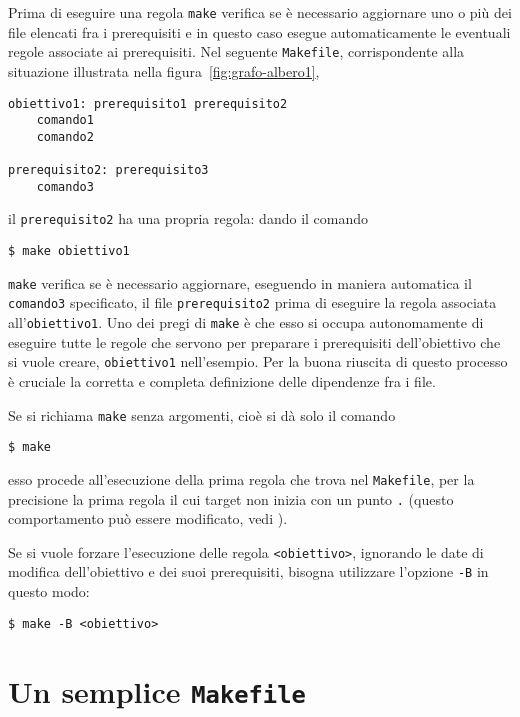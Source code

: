 Prima di eseguire una regola \texttt{make} verifica se è necessario aggiornare
uno o più dei file elencati fra i prerequisiti e in questo caso esegue
automaticamente le eventuali regole associate ai prerequisiti.  Nel seguente
\texttt{Makefile}, corrispondente alla situazione illustrata nella
figura~\ref{fig:grafo-albero1},
\begin{lstlisting}
obiettivo1: prerequisito1 prerequisito2
	comando1
	comando2

prerequisito2: prerequisito3
	comando3
\end{lstlisting}
il \texttt{prerequisito2} ha una propria regola: dando il comando
\begin{verbatim}
$ make obiettivo1
\end{verbatim} %
\texttt{make} verifica se è necessario aggiornare, eseguendo in maniera
automatica il \texttt{comando3} specificato, il file \texttt{prerequisito2}
prima di eseguire la regola associata all'\texttt{obiettivo1}.  Uno dei pregi di
\texttt{make} è che esso si occupa autonomamente di eseguire tutte le regole che
servono per preparare i prerequisiti dell'obiettivo che si vuole creare,
\texttt{obiettivo1} nell'esempio.  Per la buona riuscita di questo processo è
cruciale la corretta e completa definizione delle dipendenze fra i file.

Se si richiama \texttt{make} senza argomenti, cioè si dà solo il comando
\begin{verbatim}
$ make
\end{verbatim} %
esso procede all'esecuzione della prima regola che trova nel \texttt{Makefile},
per la precisione la prima regola il cui target non inizia con un punto \texttt{.}
(questo comportamento può essere modificato, vedi \textcite[5]{gnu:make}).

Se si vuole forzare l'esecuzione delle regola \texttt{<obiettivo>}, ignorando le
date di modifica dell'obiettivo e dei suoi prerequisiti, bisogna utilizzare
l'opzione \texttt{-B} in questo modo:
\begin{verbatim}
$ make -B <obiettivo>
\end{verbatim} %

\section{Un semplice \texttt{Makefile}}
\label{sec:makefile-semplice}

